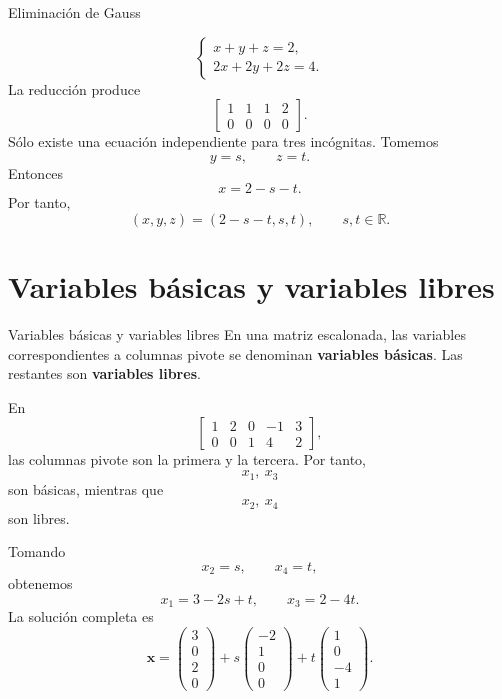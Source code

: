\documentclass[aspectratio=169,9pt]{beamer}
\theoremstyle{remark}
\newcommand{\R}{\mathbb{R}}
\begin{document}
\begin{frame}[allowframebreaks,t]{Eliminación de Gauss}
\par{}\par\smallskip

\[
\begin{cases}
x+y+z=2,\\
2x+2y+2z=4.
\end{cases}
\]
La reducción produce
\[
\left[
\begin{array}{ccc|c}
1&1&1&2\\
0&0&0&0
\end{array}
\right].
\]
Sólo existe una ecuación independiente para tres incógnitas. Tomemos
\[
y=s,\qquad z=t.
\]
Entonces
\[
x=2-s-t.
\]
Por tanto,
\[
\boxed{(x,y,z)=(2-s-t,s,t),\qquad s,t\in\R.}
\]
\end{frame}

\section{Variables básicas y variables libres}
\begin{frame}[allowframebreaks,t]{Variables básicas y variables libres}
En una matriz escalonada, las variables correspondientes a columnas pivote se denominan
\textbf{variables básicas}. Las restantes son \textbf{variables libres}.

En
\[
\left[
\begin{array}{cccc|c}
1&2&0&-1&3\\
0&0&1&4&2
\end{array}
\right],
\]
las columnas pivote son la primera y la tercera. Por tanto,
\[
x_1,\ x_3
\]
son básicas, mientras que
\[
x_2,\ x_4
\]
son libres.

Tomando
\[
x_2=s,\qquad x_4=t,
\]
obtenemos
\[
x_1=3-2s+t,\qquad x_3=2-4t.
\]
La solución completa es
\[
\mathbf{x}=
\begin{pmatrix}3\\0\\2\\0\end{pmatrix}
+s\begin{pmatrix}-2\\1\\0\\0\end{pmatrix}
+t\begin{pmatrix}1\\0\\-4\\1\end{pmatrix}.
\]
\end{frame}
\end{document}
